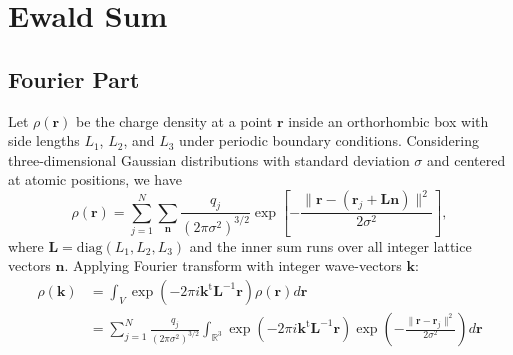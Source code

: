 \documentclass[11pt]{article}
\newcommand{\mt}[1]{\boldsymbol{\mathbf{#1}}}           %
\newcommand{\vt}[1]{\boldsymbol{\mathbf{#1}}}           %
\newcommand{\tr}[1]{#1^\text{t}}                        %
\begin{document}
\section{Ewald Sum}

\subsection{Fourier Part}

Let $\rho(\vt r)$ be the charge density at a point $\vt r$ inside an orthorhombic box with side lengths $L_1$, $L_2$, and $L_3$ under periodic boundary conditions. Considering three-dimensional Gaussian distributions with standard deviation $\sigma$ and centered at atomic positions, we have
\begin{equation*}
\rho(\vt r) = \sum_{j=1}^N \sum_{\vt n} \frac{q_j}{(2\pi\sigma^2)^{3/2}}\exp\left[-\frac{\|\vt r - (\vt r_j + \mt L\vt n)\|^2}{2\sigma^2}\right],
\end{equation*}
where $\mt L = \text{diag}(L_1,L_2,L_3)$ and the inner sum runs over all integer lattice vectors $\vt n$. Applying Fourier transform with integer wave-vectors $\vt k$:
\begin{align*}
\rho(\vt k) &= \int_V \exp\left(-2\pi i \tr{\vt k} {\mt L}^{-1}{\vt r} \right) \rho(\vt r) d\vt r \\
&= \sum_{j=1}^N \frac{q_j}{(2\pi\sigma^2)^{3/2}} \int_{\mathbb{R}^3} \exp\left(-2\pi i \tr{\vt k} {\mt L}^{-1}{\vt r} \right) \exp\left(-\frac{\|\vt r - \vt r_j\|^2}{2\sigma^2}\right) d\vt r
\end{align*}
\end{document}
